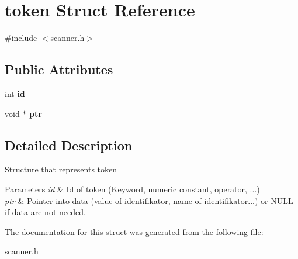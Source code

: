 \hypertarget{structtoken}{}\section{token Struct Reference}
\label{structtoken}


{\ttfamily \#include $<$scanner.\+h$>$}

\subsection*{Public Attributes}
\begin{DoxyCompactItemize}
\item 
int {\bfseries id}\hypertarget{structtoken_a0bb5b4fb1d645554ebecfd03eeb24f93}{}\label{structtoken_a0bb5b4fb1d645554ebecfd03eeb24f93}

\item 
void $\ast$ {\bfseries ptr}\hypertarget{structtoken_a10ee4b9954a7330aeabf87082fee7bbd}{}\label{structtoken_a10ee4b9954a7330aeabf87082fee7bbd}

\end{DoxyCompactItemize}


\subsection{Detailed Description}
Structure that represents token 
\begin{DoxyParams}{Parameters}
{\em id} & Id of token (Keyword, numeric constant, operator, ...) \\
\hline
{\em ptr} & Pointer into data (value of identifikator, name of identifikator...) or N\+U\+LL if data are not needed. \\
\hline
\end{DoxyParams}


The documentation for this struct was generated from the following file\+:\begin{DoxyCompactItemize}
\item 
scanner.\+h\end{DoxyCompactItemize}
